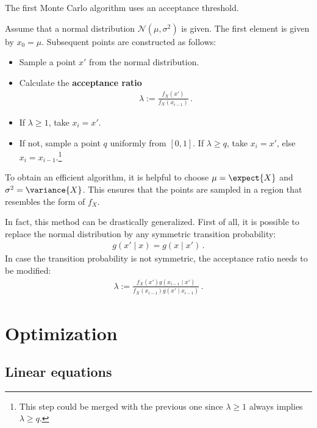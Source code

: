     The first Monte Carlo algorithm uses an acceptance threshold.
    \begin{method}
        Assume that a normal distribution $\mathcal{N}(\mu,\sigma^2)$ is given. The first element is given by $x_0=\mu$. Subsequent points are constructed as follows:
        \begin{itemize}
            \item Sample a point $x'$ from the normal distribution.
            \item Calculate the \textbf{acceptance ratio}
            \begin{gather}
                \lambda := \frac{f_X(x')}{f_X(x_{i-1})}\,.
            \end{gather}
            \item If $\lambda\geq1$, take $x_i=x'$.
            \item If not, sample a point $q$ uniformly from $[0,1]$. If $\lambda\geq q$, take $x_i=x'$, else $x_i=x_{i-1}$.\footnote{This step could be merged with the previous one since $\lambda\geq1$ always implies $\lambda\geq q$.}
        \end{itemize}
        To obtain an efficient algorithm, it is helpful to choose $\mu=\expect{X}$ and $\sigma^2=\variance{X}$. This ensures that the points are sampled in a region that resembles the form of $f_X$.

        In fact, this method can be drastically generalized. First of all, it is possible to replace the normal distribution by any symmetric transition probability:
        \begin{gather}
            g(x'\mid x) = g(x\mid x')\,.
        \end{gather}
        In case the transition probability is not symmetric, the acceptance ratio needs to be modified:
        \begin{gather}
            \lambda := \frac{f_X(x')g(x_{i-1}\mid x')}{f_X(x_{i-1})g(x'\mid x_{i-1})}\,.
        \end{gather}
    \end{method}

\section{Optimization}
\subsection{Linear equations}

